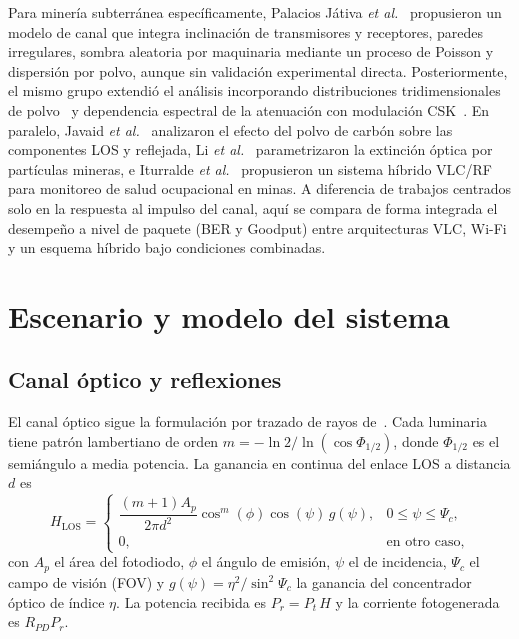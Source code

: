 \documentclass[conference]{IEEEtran}
\begin{document}
Para minería subterránea específicamente, Palacios Játiva \emph{et al.}~\cite{palacios2020} propusieron un modelo de canal que integra inclinación de transmisores y receptores, paredes irregulares, sombra aleatoria por maquinaria mediante un proceso de Poisson y dispersión por polvo, aunque sin validación experimental directa. Posteriormente, el mismo grupo extendió el análisis incorporando distribuciones tridimensionales de polvo~\cite{palacios2022} y dependencia espectral de la atenuación con modulación CSK~\cite{becerra2023}. En paralelo, Javaid \emph{et al.}~\cite{javaid2021} analizaron el efecto del polvo de carbón sobre las componentes LOS y reflejada, Li \emph{et al.}~\cite{li2024} parametrizaron la extinción óptica por partículas mineras, e Iturralde \emph{et al.}~\cite{iturralde2024} propusieron un sistema híbrido VLC/RF para monitoreo de salud ocupacional en minas. A diferencia de trabajos centrados solo en la respuesta al impulso del canal, aquí se compara de forma integrada el desempeño a nivel de paquete (BER y Goodput) entre arquitecturas VLC, Wi-Fi y un esquema híbrido bajo condiciones combinadas.

\section{Escenario y modelo del sistema}

\subsection{Canal óptico y reflexiones}
El canal óptico sigue la formulación por trazado de rayos de~\cite{palacios2020}. Cada luminaria tiene patrón lambertiano de orden $m = -\ln 2 / \ln(\cos\Phi_{1/2})$, donde $\Phi_{1/2}$ es el semiángulo a media potencia. La ganancia en continua del enlace LOS a distancia $d$ es
\begin{equation}
H_{\mathrm{LOS}} =
\begin{cases}
\dfrac{(m+1)A_p}{2\pi d^{2}}\cos^{m}(\phi)\cos(\psi)\,g(\psi), & 0\le\psi\le\Psi_c,\\[2mm]
0, & \text{en otro caso,}
\end{cases}
\label{eq:hlos}
\end{equation}
con $A_p$ el área del fotodiodo, $\phi$ el ángulo de emisión, $\psi$ el de incidencia, $\Psi_c$ el campo de visión (FOV) y $g(\psi)=\eta^2/\sin^2\Psi_c$ la ganancia del concentrador óptico de índice $\eta$. La potencia recibida es $P_r = P_t\,H$ y la corriente fotogenerada es $R_{PD}P_r$.
\end{document}
